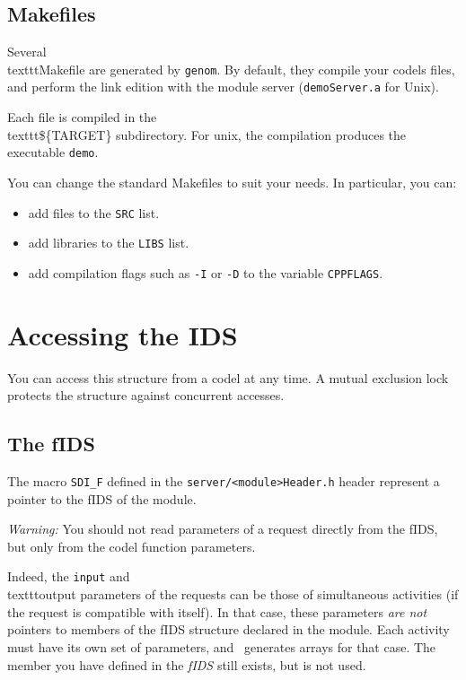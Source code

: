 \subsection{Makefiles}

Several \\texttt{Makefile} are generated   by \texttt{genom}.  By default, they
compile your codels  files, and perform the  link edition with the module
server (\texttt{demoServer.a} for Unix).

Each file  is compiled in the \\texttt{\$\{TARGET\}} subdirectory. For unix,
the compilation  produces the executable \texttt{demo}.

You can change the standard Makefiles to suit your needs. In particular,
you can:

\begin{itemize}
\item add files to the \texttt{SRC} list.
\item add libraries to the \texttt{LIBS} list.
\item add compilation flags such as \texttt{-I} or \texttt{-D} to the  variable
\texttt{CPPFLAGS}.
\end{itemize}


\section{Accessing the IDS}

You can access   this  structure from a  codel  at  any time.   A  mutual
exclusion lock protects the structure against concurrent accesses.

\subsection{The fIDS}

The macro \texttt{SDI\_F}  defined in the \texttt{server/<module>Header.h} header
represent a pointer to the fIDS of the module.

\emph{Warning:} 
 You should not read parameters
of  a  request  directly  from the  fIDS,  but only from the codel
function parameters.

Indeed, the   \texttt{input}  and \\texttt{output} parameters  of   the
requests  can  be those  of simultaneous activities  (if  the  request is
compatible with  itself).  In that case, these  parameters \emph{are not}
pointers to members of  the fIDS structure declared in  the module.  Each
activity  must have  its own  set  of  parameters, and \GenoM\  generates
arrays for that case. The member you have defined in the \emph{fIDS} still
exists, but is not used.

